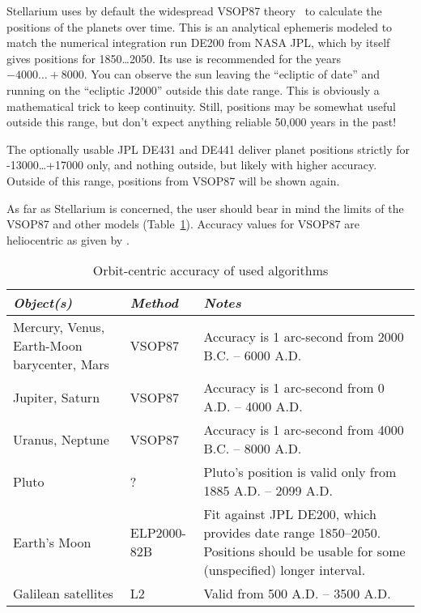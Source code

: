 Stellarium uses by default the widespread VSOP87 theory~\citep{1988A&A...202..309B} %
to calculate the positions of the planets over time.
This is an analytical ephemeris modeled to match the numerical
integration run DE200 from NASA JPL, which by itself gives positions for 1850\ldots2050. 
Its use is recommended for the years $-4000\ldots+8000$. You can observe the sun leaving the ``ecliptic
of date'' and running on the ``ecliptic J2000'' outside this date
range. This is obviously a mathematical trick to keep
continuity. Still, positions may be somewhat useful outside this
range, but don't expect anything reliable 50,000 years in the past! 

The optionally usable JPL DE431 and DE441 deliver planet positions strictly for
-13000\ldots+17000 only, and nothing outside, but likely with higher accuracy. 
Outside of this range, positions from VSOP87 will be shown again.

As far as Stellarium is concerned, the user should bear in mind the
limits of the VSOP87 and other models (Table~\ref{tab:Accuracy:Planets}).
Accuracy values for VSOP87 are heliocentric as given by \citet{1988A&A...202..309B}.

\begin{table}[tb]
\begin{tabularx}{\textwidth}{X|l|X}
\toprule
\emph{Object(s)} & \emph{Method} & \emph{Notes}\tabularnewline
\midrule
Mercury, Venus, Earth-Moon barycenter, Mars & VSOP87 & Accuracy is 1 arc-second from 2000 B.C. -- 6000 A.D. \\%
Jupiter, Saturn                             & VSOP87 & Accuracy is 1 arc-second from 0 A.D. -- 4000 A.D.    \\%
Uranus, Neptune                             & VSOP87 & Accuracy is 1 arc-second from 4000 B.C. -- 8000 A.D. \\%
Pluto                                       & ?      & Pluto's position is valid only from 1885 A.D. -- 2099 A.D.\\%
Earth's Moon                                & ELP2000-82B & Fit against JPL DE200, which provides date range 1850--2050. 
                                                            Positions should be usable for some (unspecified) longer interval. \\%
Galilean satellites                         & L2     & Valid from 500 A.D. -- 3500 A.D.\\ 
\bottomrule
\end{tabularx}
\caption{Orbit-centric accuracy of used algorithms}
\label{tab:Accuracy:Planets}
\end{table}

